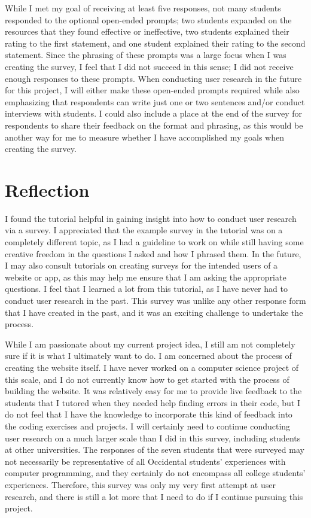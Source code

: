 \documentclass[10pt,twocolumn]{article}
\begin{document}
While I met my goal of receiving at least five responses, not many students responded to the optional open-ended prompts; two students expanded on the resources that they found effective or ineffective, two students explained their rating to the first statement, and one student explained their rating to the second statement. Since the phrasing of these prompts was a large focus when I was creating the survey, I feel that I did not succeed in this sense; I did not receive enough responses to these prompts. When conducting user research in the future for this project, I will either make these open-ended prompts required while also emphasizing that respondents can write just one or two sentences and/or conduct interviews with students. I could also include a place at the end of the survey for respondents to share their feedback on the format and phrasing, as this would be another way for me to measure whether I have accomplished my goals when creating the survey. 

\section{Reflection}

I found the tutorial helpful in gaining insight into how to conduct user research via a survey. I appreciated that the example survey in the tutorial was on a completely different topic, as I had a guideline to work on while still having some creative freedom in the questions I asked and how I phrased them. In the future, I may also consult tutorials on creating surveys for the intended users of a website or app, as this may help me ensure that I am asking the appropriate questions. I feel that I learned a lot from this tutorial, as I have never had to conduct user research in the past. This survey was unlike any other response form that I have created in the past, and it was an exciting challenge to undertake the process.

While I am passionate about my current project idea, I still am not completely sure if it is what I ultimately want to do. I am concerned about the process of creating the website itself. I have never worked on a computer science project of this scale, and I do not currently know how to get started with the process of building the website. It was relatively easy for me to provide live feedback to the students that I tutored when they needed help finding errors in their code, but I do not feel that I have the knowledge to incorporate this kind of feedback into the coding exercises and projects. I will certainly need to continue conducting user research on a much larger scale than I did in this survey, including students at other universities. The responses of the seven students that were surveyed may not necessarily be representative of all Occidental students’ experiences with computer programming, and they certainly do not encompass all college students’ experiences. Therefore, this survey was only my very first attempt at user research, and there is still a lot more that I need to do if I continue pursuing this project.

\printbibliography
\end{document}
